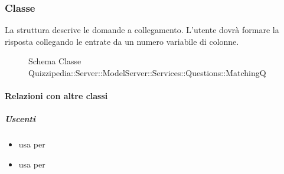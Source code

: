 \subsubsection{Classe }
La struttura descrive le domande a collegamento. L'utente dovrà formare la risposta collegando le entrate da un numero variabile di colonne.
\begin{figure}[H]
\centering
\noindent{}
\caption[Schema Classe MatchingQ]{Schema Classe Quizzipedia::Server::ModelServer::Services::Questions::MatchingQ}
\end{figure}
\paragraph{Relazioni con altre classi}
\subparagraph{Uscenti}
\begin{itemize}
\item usa  per 
\item usa  per 
\end{itemize}
